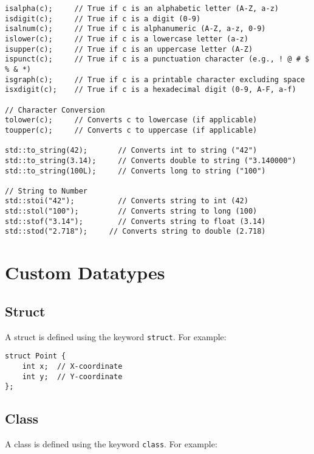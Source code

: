 \begin{lstlisting}[style = codeexpert]
isalpha(c);     // True if c is an alphabetic letter (A-Z, a-z)
isdigit(c);     // True if c is a digit (0-9)
isalnum(c);     // True if c is alphanumeric (A-Z, a-z, 0-9)
islower(c);     // True if c is a lowercase letter (a-z)
isupper(c);     // True if c is an uppercase letter (A-Z)
ispunct(c);     // True if c is a punctuation character (e.g., ! @ # $ % & *)
isgraph(c);     // True if c is a printable character excluding space
isxdigit(c);    // True if c is a hexadecimal digit (0-9, A-F, a-f)

// Character Conversion
tolower(c);     // Converts c to lowercase (if applicable)
toupper(c);     // Converts c to uppercase (if applicable)

std::to_string(42);       // Converts int to string ("42")
std::to_string(3.14);     // Converts double to string ("3.140000")
std::to_string(100L);     // Converts long to string ("100")

// String to Number
std::stoi("42");          // Converts string to int (42)
std::stol("100");         // Converts string to long (100)
std::stof("3.14");        // Converts string to float (3.14)
std::stod("2.718");     // Converts string to double (2.718)
\end{lstlisting}




\section{Custom Datatypes}

\subsection{Struct}

A struct is defined using the keyword \texttt{struct}. For example:

\begin{lstlisting}[style=codeexpert]
struct Point {
    int x;  // X-coordinate
    int y;  // Y-coordinate
};
\end{lstlisting}



\subsection{Class}
A class is defined using the keyword \texttt{class}. For example:

